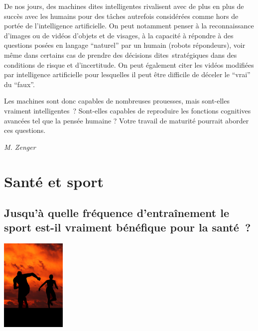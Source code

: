 \documentclass[
  10pt,
  french,
  a5paper,
  openany]{book}
\newenvironment{signature}{\begin{flushright}}{\end{flushright}}
\begin{document}
De nos jours, des machines dites intelligentes rivalisent avec de plus en plus de succès avec les humains pour des tâches autrefois considérées comme hors de portée de l'intelligence artificielle. On peut notamment penser à la reconnaissance d'images ou de vidéos d'objets et de visages, à la capacité à répondre à des questions posées en langage ``naturel'' par un humain (robots répondeurs), voir même dans certains cas de prendre des décisions dites~stratégiques dans des conditions de risque et d'incertitude. On peut également citer les vidéos modifiées par intelligence artificielle pour lesquelles il peut être difficile de déceler le ``vrai'' du ``faux''.

Les machines sont donc capables de nombreuses prouesses, mais sont-elles vraiment intelligentes~? Sont-elles capables de reproduire les fonctions cognitives avancées tel que la pensée humaine ? Votre travail de maturité pourrait aborder ces questions.

\begin{signature}
\emph{M. Zenger}

\end{signature}

\hypertarget{santuxe9-et-sport}{%
\chapter{Santé et sport}\label{santuxe9-et-sport}}

\hypertarget{jusquuxe0-quelle-fruxe9quence-dentrauxeenement-le-sport-est-il-vraiment-buxe9nuxe9fique-pour-la-santuxe9}{%
\section{Jusqu'à quelle fréquence d'entraînement le sport est-il vraiment bénéfique pour la santé~?}\label{jusquuxe0-quelle-fruxe9quence-dentrauxeenement-le-sport-est-il-vraiment-buxe9nuxe9fique-pour-la-santuxe9}}

\begin{center}
\includegraphics[width=\textwidth,height=12em]{images/sante-sport.jpg}

\end{center}
\end{document}
